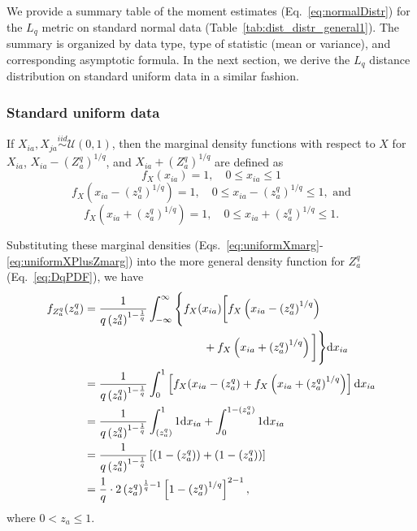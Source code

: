 \documentclass[aoas]{imsart}
\begin{document}
We provide a summary table of the moment estimates (Eq.~\ref{eq:normalDistr}) for the $L_q$ metric on standard normal data (Table~\ref{tab:dist_distr_general1}). The summary is organized by data type, type of statistic (mean or variance), and corresponding asymptotic formula. In the next section, we derive the $L_q$ distance distribution on standard uniform data in a similar fashion.

\subsubsection{Standard uniform data}

If $X_{ia},X_{ja} \overset{iid}{\sim} \mathcal{U}(0,1)$, then the marginal density functions with respect to $X$ for $X_{ia}$, $X_{ia} - \left(Z^q_a\right)^{1/q}$, and $X_{ia} + \left(Z^q_a\right)^{1/q}$ are defined as
%
\begin{equation}\label{eq:uniformXmarg}
f_X(x_{ia}) = 1, \quad 0 \leq x_{ia} \leq 1
\end{equation}
%
\begin{equation}\label{eq:uniformXMinusZmarg}
f_X\left(x_{ia} - \left(z^q_a\right)^{1/q}\right) = 1, \quad 0 \leq x_{ia} - \left(z^q_a\right)^{1/q} \leq 1, \text{ and}
\end{equation}
%
\begin{equation}\label{eq:uniformXPlusZmarg}
f_X\left(x_{ia} + \left(z^q_a\right)^{1/q}\right) = 1, \quad 0 \leq x_{ia} + \left(z^q_a\right)^{1/q} \leq 1.
\end{equation}

Substituting these marginal densities (Eqs.~\ref{eq:uniformXmarg}-\ref{eq:uniformXPlusZmarg}) into the more general density function for $Z^q_a$ (Eq.~\ref{eq:DqPDF}), we have
%
\begin{equation}\label{eq:uniformDqPDF}
\begin{aligned}
f_{Z^q_a}(z^q_a) &= \frac{1}{q\left(z^q_a\right)^{1 - \frac{1}{q}}}\int_{-\infty}^{\infty}{\Biggl\{}f_X(x_{ia}){\biggl[}f_X\left(x_{ia} - \left(z^q_a\right)^{1/q}\right)\\ 
&\hspace{3.7cm}+ f_X\left(x_{ia} + \left(z^q_a\right)^{1/q}\right){\biggr]}{\Biggl\}}\text{d}x_{ia}\\
&= \frac{1}{q\left(z^q_a\right)^{1 - \frac{1}{q}}}\int_{0}^{1}\left[f_X(x_{ia} - \left(z^q_a\right) + f_X\left(x_{ia} + \left(z^q_a\right)^{1/q}\right)\right]\text{d}x_{ia} \\
&= \frac{1}{q\left(z^q_a\right)^{1 - \frac{1}{q}}}\int_{\left(z^q_a\right)}^{1}1\text{d}x_{ia} + \int_{0}^{1 - \left(z^q_a\right)}1\text{d}x_{ia}\\
&= \frac{1}{q\left(z^q_a\right)^{1 - \frac{1}{q}}}\left[\left(1 - \left(z^q_a\right)\right) + \left(1 - \left(z^q_a\right)\right)\right]\\
&= \frac{1}{q} \cdot 2 \left(z^q_a\right)^{\frac{1}{q} - 1}\left[1 - \left(z^q_a\right)^{1/q}\right]^{2 - 1},
\end{aligned}
\end{equation}
%
where $0 < z_a \leq 1$.
\end{document}
